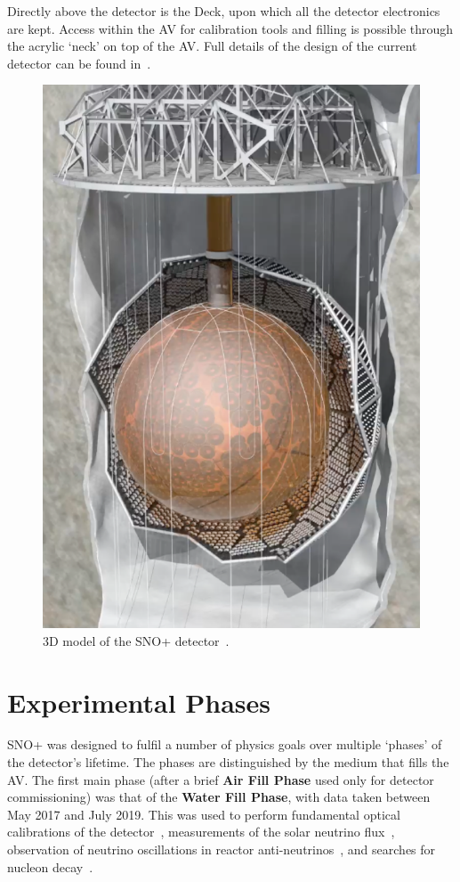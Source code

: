 Directly above the detector is the Deck, upon which all the detector electronics are kept. Access within the AV for calibration tools and filling is possible through the acrylic `neck' on top of the AV. Full details of the design of the current detector can be found in~\cite{albaneseSNOExperiment2021}.

\begin{figure}
    \centering
    \includegraphics[width=0.48\linewidth]{2_Detector/Figs/detector_picture.png}
    \caption[3D model of the SNO+ detector]{3D model of the SNO+ detector~\cite{albaneseSNOExperiment2021}.}
    \label{fig:snoplus_detector}
\end{figure}

\section{Experimental Phases}\label{sec:exp_phases}
SNO+ was designed to fulfil a number of physics goals over multiple `phases' of the detector's lifetime. The phases are distinguished by the medium that fills the AV. The first main phase (after a brief \textbf{Air Fill Phase} used only for detector commissioning) was that of the \textbf{Water Fill Phase}, with data taken between May 2017 and July 2019. This was used to perform fundamental optical calibrations of the detector~\cite{andersonOpticalCalibrationSNO2021}, %
measurements of the solar neutrino flux~\cite{andersonMeasurementSolarNeutrino2019}, %
observation of neutrino oscillations in reactor anti-neutrinos~\cite{allegaEvidenceAntineutrinosDistant2023}, %
and searches for nucleon decay~\cite{andersonSearchInvisibleModes2019,allegaImprovedSearchInvisible2022}. %

